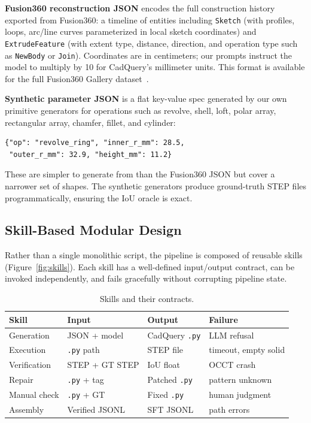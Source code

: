 \noindent\textbf{Fusion360 reconstruction JSON} encodes the full construction history exported from Fusion360: a timeline of entities including \texttt{Sketch} (with profiles, loops, arc/line curves parameterized in local sketch coordinates) and \texttt{ExtrudeFeature} (with extent type, distance, direction, and operation type such as \texttt{NewBody} or \texttt{Join}). Coordinates are in centimeters; our prompts instruct the model to multiply by 10 for CadQuery's millimeter units. This format is available for the full Fusion360 Gallery dataset~\cite{fusion360gallery}.

\noindent\textbf{Synthetic parameter JSON} is a flat key-value spec generated by our own primitive generators for operations such as revolve, shell, loft, polar array, rectangular array, chamfer, fillet, and cylinder:
\begin{verbatim}
{"op": "revolve_ring", "inner_r_mm": 28.5,
 "outer_r_mm": 32.9, "height_mm": 11.2}
\end{verbatim}
These are simpler to generate from than the Fusion360 JSON but cover a narrower set of shapes. The synthetic generators produce ground-truth STEP files programmatically, ensuring the IoU oracle is exact.

\subsection{Skill-Based Modular Design}

Rather than a single monolithic script, the pipeline is composed of reusable skills (Figure~\ref{fig:skills}). Each skill has a well-defined input/output contract, can be invoked independently, and fails gracefully without corrupting pipeline state.

\begin{table}[h]
\centering
\small
\caption{Skills and their contracts.}
\label{tab:skills}
\begin{tabular}{llll}
\toprule
\textbf{Skill} & \textbf{Input} & \textbf{Output} & \textbf{Failure} \\
\midrule
Generation & JSON + model & CadQuery \texttt{.py} & LLM refusal \\
Execution & \texttt{.py} path & STEP file & timeout, empty solid \\
Verification & STEP + GT STEP & IoU float & OCCT crash \\
Repair & \texttt{.py} + tag & Patched \texttt{.py} & pattern unknown \\
Manual check & \texttt{.py} + GT & Fixed \texttt{.py} & human judgment \\
Assembly & Verified JSONL & SFT JSONL & path errors \\
\bottomrule
\end{tabular}
\end{table}

